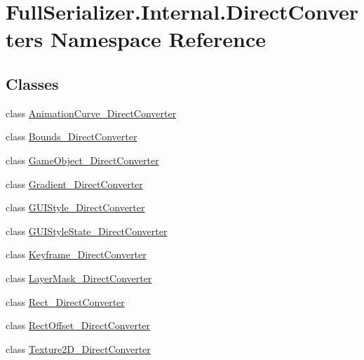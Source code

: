 \hypertarget{namespace_full_serializer_1_1_internal_1_1_direct_converters}{}\section{Full\+Serializer.\+Internal.\+Direct\+Converters Namespace Reference}
\label{namespace_full_serializer_1_1_internal_1_1_direct_converters}
\subsection*{Classes}
\begin{DoxyCompactItemize}
\item 
class \hyperlink{class_full_serializer_1_1_internal_1_1_direct_converters_1_1_animation_curve___direct_converter}{Animation\+Curve\+\_\+\+Direct\+Converter}
\item 
class \hyperlink{class_full_serializer_1_1_internal_1_1_direct_converters_1_1_bounds___direct_converter}{Bounds\+\_\+\+Direct\+Converter}
\item 
class \hyperlink{class_full_serializer_1_1_internal_1_1_direct_converters_1_1_game_object___direct_converter}{Game\+Object\+\_\+\+Direct\+Converter}
\item 
class \hyperlink{class_full_serializer_1_1_internal_1_1_direct_converters_1_1_gradient___direct_converter}{Gradient\+\_\+\+Direct\+Converter}
\item 
class \hyperlink{class_full_serializer_1_1_internal_1_1_direct_converters_1_1_g_u_i_style___direct_converter}{G\+U\+I\+Style\+\_\+\+Direct\+Converter}
\item 
class \hyperlink{class_full_serializer_1_1_internal_1_1_direct_converters_1_1_g_u_i_style_state___direct_converter}{G\+U\+I\+Style\+State\+\_\+\+Direct\+Converter}
\item 
class \hyperlink{class_full_serializer_1_1_internal_1_1_direct_converters_1_1_keyframe___direct_converter}{Keyframe\+\_\+\+Direct\+Converter}
\item 
class \hyperlink{class_full_serializer_1_1_internal_1_1_direct_converters_1_1_layer_mask___direct_converter}{Layer\+Mask\+\_\+\+Direct\+Converter}
\item 
class \hyperlink{class_full_serializer_1_1_internal_1_1_direct_converters_1_1_rect___direct_converter}{Rect\+\_\+\+Direct\+Converter}
\item 
class \hyperlink{class_full_serializer_1_1_internal_1_1_direct_converters_1_1_rect_offset___direct_converter}{Rect\+Offset\+\_\+\+Direct\+Converter}
\item 
class \hyperlink{class_full_serializer_1_1_internal_1_1_direct_converters_1_1_texture2_d___direct_converter}{Texture2\+D\+\_\+\+Direct\+Converter}
\end{DoxyCompactItemize}
